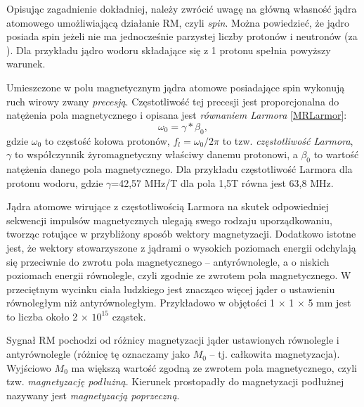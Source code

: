 Opisując zagadnienie dokładniej, należy zwrócić uwagę na główną własność jądra atomowego umożliwiającą działanie RM, czyli \textit{spin}. Można powiedzieć, że jądro posiada spin jeżeli nie ma jednocześnie parzystej liczby protonów i neutronów (za \cite{RM2015}). Dla przykładu jądro wodoru składające się z 1 protonu spełnia powyższy warunek. 

Umieszczone w polu magnetycznym jądra atomowe posiadające spin wykonują ruch wirowy zwany \textit{precesją}. Częstotliwość tej precesji jest proporcjonalna do natężenia pola magnetycznego i opisana jest \textit{równaniem Larmora} \ref{MRLarmor}:
\begin{equation}
\label{MRLarmor}
\omega_0 = \gamma \ast \beta_0,
\end{equation}
gdzie $\omega_0$ to częstość kołowa protonów, $f_l = \omega_0/2\pi$ to tzw. \textit{częstotliwość Larmora}, $\gamma$ to współczynnik żyromagnetyczny właściwy danemu protonowi, a $\beta_0$ to wartość natężenia danego pola magnetycznego. Dla przykładu częstotliwość Larmora dla protonu wodoru, gdzie $\gamma$=42,57 MHz/T dla pola 1,5T równa jest 63,8 MHz. 

Jądra atomowe wirujące z częstotliwością Larmora na skutek odpowiedniej sekwencji impulsów magnetycznych ulegają swego rodzaju uporządkowaniu, tworząc rotujące w przybliżony sposób wektory magnetyzacji. Dodatkowo istotne jest, że wektory stowarzyszone z jądrami o wysokich poziomach energii odchylają się przeciwnie do zwrotu pola magnetycznego -- antyrównolegle, a o niskich poziomach energii równolegle, czyli zgodnie ze zwrotem pola magnetycznego. W przeciętnym wycinku ciała ludzkiego jest znacząco więcej jąder o ustawieniu równoległym niż antyrównoległym. Przykładowo w objętości 1 $\times$ 1 $\times$ 5 mm jest to liczba około 2 $\times$ $10^{15}$ cząstek. 

Sygnał RM pochodzi od różnicy magnetyzacji jąder ustawionych równolegle i antyrównolegle (różnicę tę oznaczamy jako $M_0$ -- tj. całkowita magnetyzacja). Wyjściowo $M_0$ ma większą wartość zgodną ze zwrotem pola magnetycznego, czyli tzw. \textit{magnetyzację podłużną}. Kierunek prostopadły do magnetyzacji podłużnej nazywany jest \textit{magnetyzacją poprzeczną}.

